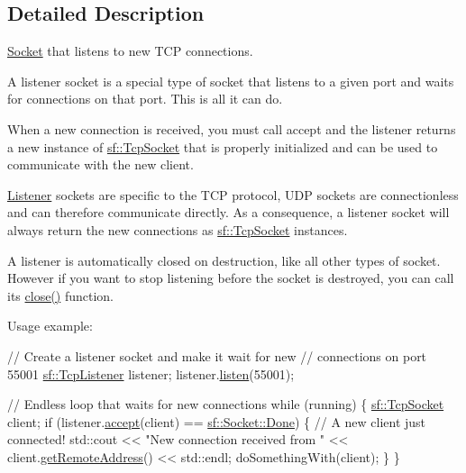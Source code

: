 \subsection{Detailed Description}
\hyperlink{classsf_1_1Socket}{Socket} that listens to new T\-C\-P connections. 

A listener socket is a special type of socket that listens to a given port and waits for connections on that port. This is all it can do.

When a new connection is received, you must call accept and the listener returns a new instance of \hyperlink{classsf_1_1TcpSocket}{sf\-::\-Tcp\-Socket} that is properly initialized and can be used to communicate with the new client.

\hyperlink{classsf_1_1Listener}{Listener} sockets are specific to the T\-C\-P protocol, U\-D\-P sockets are connectionless and can therefore communicate directly. As a consequence, a listener socket will always return the new connections as \hyperlink{classsf_1_1TcpSocket}{sf\-::\-Tcp\-Socket} instances.

A listener is automatically closed on destruction, like all other types of socket. However if you want to stop listening before the socket is destroyed, you can call its \hyperlink{classsf_1_1TcpListener_a3a00a850506bd0f9f48867a0fe59556b}{close()} function.

Usage example\-: 
\begin{DoxyCode}
\textcolor{comment}{// Create a listener socket and make it wait for new}
\textcolor{comment}{// connections on port 55001}
\hyperlink{classsf_1_1TcpListener}{sf::TcpListener} listener;
listener.\hyperlink{classsf_1_1TcpListener_a409d9350d3abfea9636df8cf4a61004e}{listen}(55001);

\textcolor{comment}{// Endless loop that waits for new connections}
\textcolor{keywordflow}{while} (running)
\{
    \hyperlink{classsf_1_1TcpSocket}{sf::TcpSocket} client;
    \textcolor{keywordflow}{if} (listener.\hyperlink{classsf_1_1TcpListener_ae2c83ce5a64d50b68180c46bef0a7346}{accept}(client) == \hyperlink{classsf_1_1Socket_a51bf0fd51057b98a10fbb866246176dca1de3a85bc56d3ae85b3d0f3cfd04ae90}{sf::Socket::Done})
    \{
        \textcolor{comment}{// A new client just connected!}
        std::cout << \textcolor{stringliteral}{"New connection received from "} << client.\hyperlink{classsf_1_1TcpSocket_a7904ca6ab9e018021e305a3aeb7a1b9a}{getRemoteAddress}() << 
      std::endl;
        doSomethingWith(client);
    \}
\}
\end{DoxyCode}


